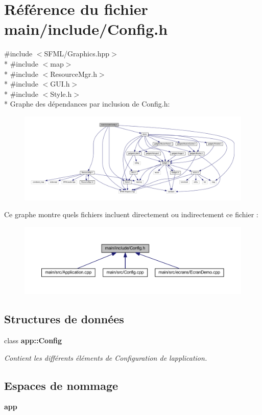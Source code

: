 \section{Référence du fichier main/include/\+Config.h}
\label{_config_8h}
{\ttfamily \#include $<$S\+F\+M\+L/\+Graphics.\+hpp$>$}\\*
{\ttfamily \#include $<$map$>$}\\*
{\ttfamily \#include $<$Resource\+Mgr.\+h$>$}\\*
{\ttfamily \#include $<$G\+U\+I.\+h$>$}\\*
{\ttfamily \#include $<$Style.\+h$>$}\\*
Graphe des dépendances par inclusion de Config.\+h\+:\nopagebreak
\begin{figure}[H]
\begin{center}
\leavevmode
\includegraphics[width=350pt]{_config_8h__incl}
\end{center}
\end{figure}
Ce graphe montre quels fichiers incluent directement ou indirectement ce fichier \+:\nopagebreak
\begin{figure}[H]
\begin{center}
\leavevmode
\includegraphics[width=350pt]{_config_8h__dep__incl}
\end{center}
\end{figure}
\subsection*{Structures de données}
\begin{DoxyCompactItemize}
\item 
class {\bf app\+::\+Config}
\begin{DoxyCompactList}\small\item\em Contient les différents éléments de Configuration de l\textquotesingle{}application. \end{DoxyCompactList}\end{DoxyCompactItemize}
\subsection*{Espaces de nommage}
\begin{DoxyCompactItemize}
\item 
 {\bf app}
\end{DoxyCompactItemize}
